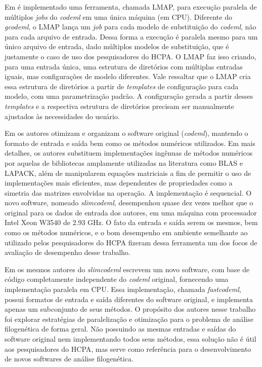 \documentclass[cic,tc]{iiufrgs}
\begin{document}
Em \cite{maldonado2016lmap} é implementado uma
ferramenta, chamada LMAP, para execução paralela de múltiplos \textit{jobs} do
\textit{codeml} em uma única máquina (em CPU). Diferente do \textit{gcodeml}, o LMAP lança um
\textit{job} para cada modelo de substituição do \textit{codeml}, não para
cada arquivo de entrada. Dessa forma a execução é paralela mesmo para um único
arquivo de entrada, dado múltiplos modelos de substituição, que é
justamente o caso de uso dos pesquisadores do HCPA. O LMAP faz isso criando,
para uma entrada única, uma estrutura de diretórios com múltiplas entradas
iguais, mas configurações de modelo diferentes. Vale ressaltar que o LMAP cria
essa estrutura de diretórios a partir de \textit{templates} de configuração
para cada modelo, com uma parametrização padrão. A configuração gerada a partir
desses \textit{templates} e a respectiva estrutura de diretórios precisam ser
manualmente ajustados às necessidades do usuário.

Em \cite{schabauer2012slimcodeml} os autores otimizam e organizam o software
original (\textit{codeml}), mantendo o formato de entrada e saída bem como os métodos
numéricos utilizados. Em mais detalhes, os autores substituem implementações
ingênuas de métodos numéricos por aquelas de bibliotecas amplamente utilizadas
na literatura como BLAS e LAPACK, além de manipularem equações matriciais a fim
de permitir o uso de implementações mais eficientes, mas dependentes de
propriedades como a simetria das matrizes envolvidas na operação. A
implementação é sequencial. O novo software, nomeado \textit{slimcodeml}, desempenhou
quase dez vezes melhor que o original para os dados de entrada dos autores, em
uma máquina com processador Intel Xeon W3540 de 2.93 GHz. O fato da entrada e
saída serem os mesmos, bem como os métodos numéricos, e o bom desempenho em
ambiente semelhante ao utilizado pelos pesquisadores do HCPA fizeram dessa
ferramenta um dos focos de avaliação de desempenho desse trabalho.

Em \cite{valle2014optimization} os mesmos autores do \textit{slimcodeml} escrevem um
novo software, com base de código completamente independente do \textit{codeml}
original, fornecendo uma implementação paralela em CPU. Essa implementação,
chamada \textit{fastcodeml}, possui formatos de entrada e saída diferentes do software
original, e implementa apenas um subconjunto de seus métodos. O propósito dos
autores nesse trabalho foi explorar estratégias de paralelização e otimização
para o problema de análise filogenética de forma geral. Não possuindo as mesmas
entradas e saídas do software original nem implementando todos seus métodos,
essa solução não é útil aos pesquisadores do HCPA, mas serve como referência
para o desenvolvimento de novos softwares de análise filogenética.
\end{document}
